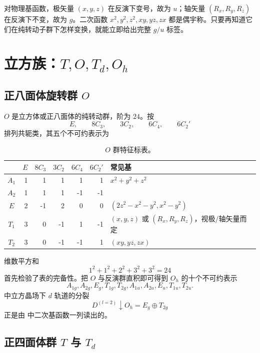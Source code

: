 对物理基函数，极矢量 $(x,y,z)$ 在反演下变号，故为 $u$；轴矢量 $(R_x,R_y,R_z)$ 在反演下不变，故为 $g$。二次函数 $x^2,y^2,z^2,xy,yz,zx$ 都是偶宇称。只要再知道它们在纯转动子群下怎样变换，就能立即给出完整 $g/u$ 标签。

\section{\texorpdfstring{立方族：$T,O,T_d,O_h$}{立方族：T, O, Td, Oh}}

\subsection{\texorpdfstring{正八面体旋转群 $O$}{正八面体旋转群 O}}

$O$ 是立方体或正八面体的纯转动群，阶为 $24$。按
\[
E,\qquad 8C_3,\qquad 3C_2,\qquad 6C_4,\qquad 6C_2'
\]
排列共轭类，其五个不可约表示为
\begin{table}[htbp]
\centering
\caption{$O$ 群特征标表。}
\label{tab:O-character}
\begin{tabular}{c|rrrrr|l}
\toprule
 & $E$ & $8C_3$ & $3C_2$ & $6C_4$ & $6C_2'$ & 常见基 \\
\midrule
$A_1$ & 1& 1& 1& 1& 1 & $x^2+y^2+z^2$\\
$A_2$ & 1& 1& 1&-1&-1 & \\
$E$   & 2&-1& 2& 0& 0 & $(2z^2-x^2-y^2,x^2-y^2)$\\
$T_1$ & 3& 0&-1& 1&-1 & $(x,y,z)$ 或 $(R_x,R_y,R_z)$，视极/轴矢量而定\\
$T_2$ & 3& 0&-1&-1& 1 & $(xy,yz,zx)$\\
\bottomrule
\end{tabular}
\end{table}

维数平方和
\[
1^2+1^2+2^2+3^2+3^2=24
\]
首先检验了表的完备性。把 $O$ 与反演群直积即可得到 $O_h$ 的十个不可约表示
\[
A_{1g},A_{2g},E_g,T_{1g},T_{2g},
A_{1u},A_{2u},E_u,T_{1u},T_{2u}.
\]
中立方晶场下 $d$ 轨道的分裂
\[
D^{(l=2)}\downarrow O_h=E_g\oplus T_{2g}
\]
正是由  中二次基函数一列读出的。

\subsection{\texorpdfstring{正四面体群 $T$ 与 $T_d$}{正四面体群 T 与 Td}}

